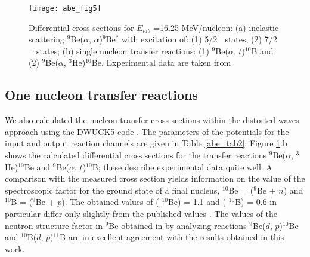 \documentclass[
12pt, %
oneside, %
english, %
onehalfspacing, %
onehalfspacing, %
headsepline, %
]{MastersDoctoralThesis} %
\begin{document}
\begin{figure}[tp]
\centering
\texttt{[image: abe\_fig5]}
\decoRule
\caption{\footnotesize  Differential cross sections for $E_{lab}$ =16.25 MeV/nucleon: (a) inelastic scattering $^9$Be($\alpha$, $\alpha$)$^9$Be$^*$ with excitation of:  (1) 5/2${}^{-}$ states, (2) 7/2$^{-}$ states; (b) single nucleon transfer reactions: (1)  ${}^{9}$Be($\alpha$, $t$)${}^{10}$B and (2) ${}^{9}$Be($\alpha$,  ${}^{3}$He)${}^{10}$Be. Experimental data are taken from \cite{harakeh1980strong, roy1995coupled, lukyanov2014study}
}
\label{abe_fig5}
\end{figure}


\subsection{One nucleon transfer reactions}
We also calculated the nucleon transfer cross sections within the distorted waves approach using the DWUCK5 code \cite{kunz}. The parameters of the potentials for the input and output reaction channels are given in Table \ref{abe_tab2}. 
Figure \ref{abe_fig5}.b shows the calculated differential cross sections for the transfer reactions ${}^{9}$Be($\alpha$,  ${}^{3}$He)${}^{10}$Be and ${}^{9}$Be($\alpha$, $t$)${}^{10}$B; these describe experimental data quite well. 
A comparison with the measured cross section yields information on the value of the spectroscopic factor   for the ground state of a final nucleus, $^{10}$Be = (${}^{9}$Be + $n$) and $^{10}$B = (${}^{9}$Be + $p$). The obtained values of  ( $^{10}$Be) = 1.1 and  ( $^{10}$B) =
0.6 in particular differ only slightly from the published values \cite{harakeh1980strong, lukyanov2014study, galanina2012mechanisms}. 
The values of the neutron structure factor in ${}^{9}$Be obtained in \cite{galanina2012mechanisms} by analyzing reactions ${}^{9}$Be($d$, $p$)${}^{10}$Be and ${}^{10}$B($d$, $p$)${}^{11}$B are in excellent agreement with the results obtained in this work.
\end{document}
